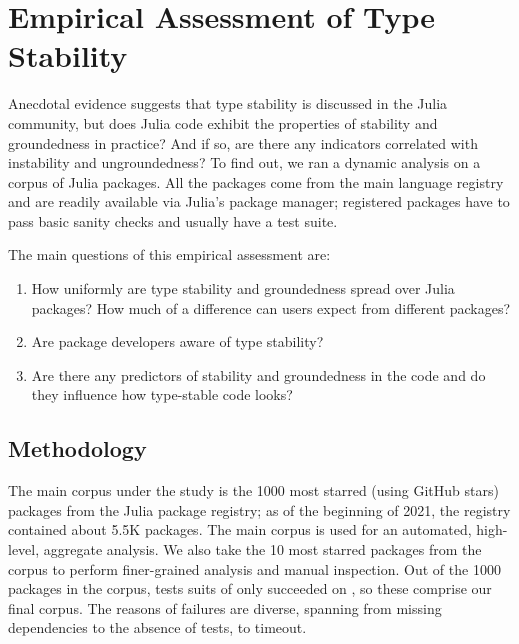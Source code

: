 \documentclass[oneside,openright,titlepage,numbers=noenddot,%
headinclude,footinclude,cleardoublepage=empty,abstract=on,
BCOR=5mm,paper=a4,fontsize=11pt,
dvipsnames
]{scrreprt}
\begin{document}
\section{Empirical Assessment of Type Stability}\label{sec:empirical}

Anecdotal evidence suggests that type stability is discussed in the
Julia community, but does Julia code exhibit the properties of stability
and groundedness in practice? And if so, are there any indicators correlated with
instability and ungroundedness? To find out, we ran a dynamic analysis on a
corpus of Julia packages. All the packages come from the main language registry
and are readily available via Julia's package manager; registered packages have
to pass basic sanity checks and usually have a test suite.

The main questions of this empirical assessment are:
\begin{enumerate}
\item How uniformly are type stability and groundedness spread over Julia packages?
  How much of a difference can users expect from different packages?
\item Are package developers aware of type stability?
\item Are there any predictors of stability and groundedness in the code and do
  they influence how type-stable code looks?
\end{enumerate}

\subsection{Methodology}

The main corpus under the study is the 1000 most starred (using GitHub stars) packages
from the Julia package registry; as of the beginning of 2021, the registry
contained about 5.5K packages. The main corpus is used for an automated,
high-level, aggregate analysis. We also take the 10 most starred packages from
the corpus to perform finer-grained analysis and manual inspection. Out of the
1000 packages in the corpus, tests suits of only \goodpkgsnum succeeded on
\juliaversion, so these \goodpkgsnum comprise our final corpus. The reasons of
failures are diverse, spanning from missing dependencies to the absence of
tests, to timeout.
\end{document}
